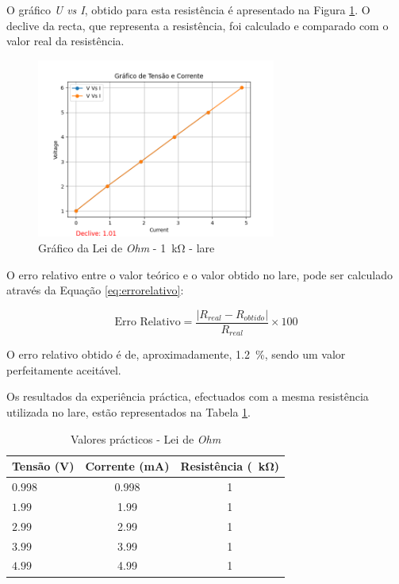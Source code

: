 O gráfico \textit{U vs I}, obtido para esta resistência é apresentado na Figura \ref{fig:grafico_LaRE_1k}. O declive da recta, que representa a resistência, foi calculado e comparado com o valor real da resistência. 

\begin{figure}[hbtp]
	\centering
	\includegraphics[width=0.7\textwidth]{figures/ohm_graph.png}
	\caption{Gráfico da Lei de \textit{Ohm} - \SI{1}{\kilo\ohm} - \acrshort{lare}}
	\label{fig:grafico_LaRE_1k}
\end{figure}

O erro relativo entre o valor teórico e o valor obtido no \acrshort{lare}, pode ser calculado através da Equação \ref{eq:errorelativo}:

\begin{equation} \label{eq:errorelativo}
	\text{Erro Relativo} = \frac{|R_{real} - R_{obtido}|}{R_{real}} \times 100
\end{equation}

O erro relativo obtido é de, aproximadamente, \SI{1.2}{\percent}, sendo um valor perfeitamente aceitável.

Os resultados da experiência práctica, efectuados com a mesma resistência utilizada no \acrshort{lare}, estão representados na Tabela \ref{Table:valoresexperimentaisohm}.

\begin{table}[htb]
	\centering
	\caption{Valores prácticos - Lei de \textit{Ohm}} 
	\label{Table:valoresexperimentaisohm}
	\begin{tabular}{lcc}
		\toprule
		Tensão (V)& Corrente (mA) & Resistência (\SI{}{\kilo\ohm}) \\
		\midrule
		$0.998$ & 0.998 & 1  \\
		\midrule
		 $1.99$ & 1.99  & 1  \\
		 \midrule
		 $2.99$ & 2.99  & 1  \\
		 \midrule
		 $3.99$ & 3.99  & 1  \\
		 \midrule
		 $4.99$ & 4.99  & 1  \\
		\bottomrule
	\end{tabular}
\end{table}

